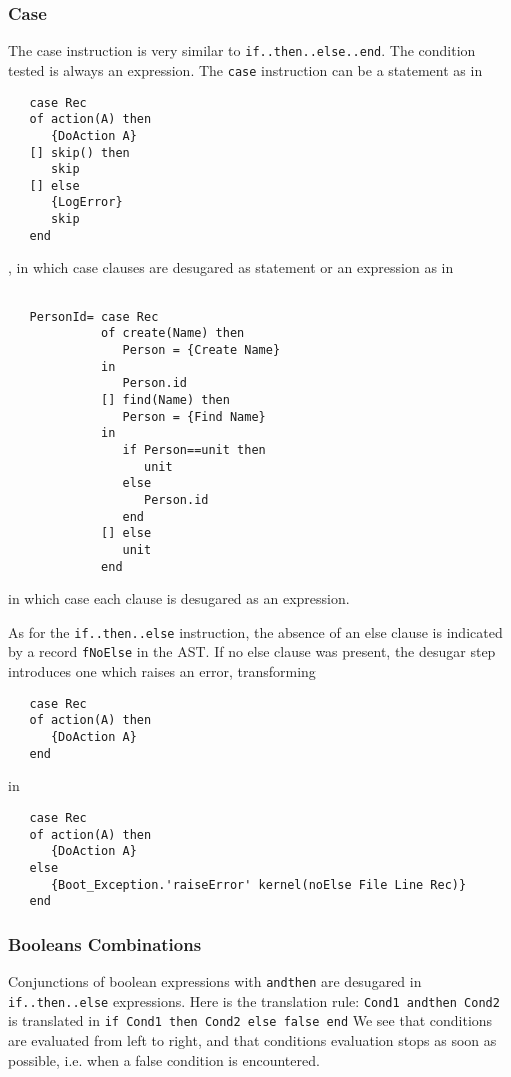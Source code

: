 \documentclass[a4paper]{memoir}
\begin{document}
\subsubsection{Case}
The case instruction is very similar to \lstinline!if..then..else..end!.
The condition tested is always an expression.
The \lstinline!case! instruction can be a statement as in 
\begin{lstlisting}
   case Rec
   of action(A) then
      {DoAction A}
   [] skip() then
      skip
   [] else
      {LogError}
      skip
   end
\end{lstlisting}
, in which case clauses are desugared as statement
or an expression as in
\begin{lstlisting}
  
   PersonId= case Rec
             of create(Name) then
                Person = {Create Name}
             in
                Person.id
             [] find(Name) then
                Person = {Find Name}
             in
                if Person==unit then
                   unit
                else
                   Person.id
                end
             [] else
                unit
             end
\end{lstlisting}
in which case each clause is desugared as an expression.

As for the \lstinline!if..then..else! instruction, the absence of an else clause
is indicated by a record \lstinline!fNoElse! in the AST. If no else clause was
present, the desugar step introduces one which raises an error, transforming

\begin{lstlisting}
   case Rec
   of action(A) then
      {DoAction A}
   end
\end{lstlisting}
in
\begin{lstlisting}
   case Rec
   of action(A) then
      {DoAction A}
   else
      {Boot_Exception.'raiseError' kernel(noElse File Line Rec)}
   end
\end{lstlisting}

\subsubsection{Booleans Combinations}
Conjunctions of boolean expressions with \lstinline!andthen! are desugared in
\lstinline!if..then..else! expressions. Here is the translation
rule:
\lstinline!Cond1 andthen Cond2! is translated in \lstinline!if Cond1 then Cond2 else false end! 
We see that conditions are evaluated from left to right, and that conditions
evaluation stops as soon as possible, i.e. when a false condition is
encountered.
\end{document}
